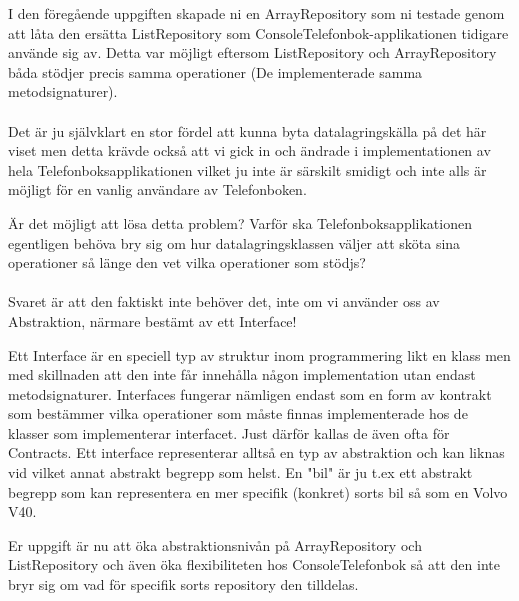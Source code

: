 \documentclass{article}
\begin{document}
I den föregående uppgiften skapade ni en ArrayRepository som ni testade genom att låta den ersätta ListRepository som ConsoleTelefonbok-applikationen tidigare använde sig av. Detta var möjligt eftersom ListRepository och ArrayRepository båda stödjer precis samma operationer (De implementerade samma metodsignaturer).\\ \\
Det är ju självklart en stor fördel att kunna byta datalagringskälla på det här viset men detta krävde också att vi gick in och ändrade i implementationen av hela Telefonboksapplikationen vilket ju inte är särskilt smidigt och inte alls är möjligt för en vanlig användare av Telefonboken.

Är det möjligt att lösa detta problem? Varför ska Telefonboksapplikationen egentligen behöva bry sig om hur datalagringsklassen väljer att sköta sina operationer så länge den vet vilka operationer som stödjs? \\ \\Svaret är att den faktiskt inte behöver det, inte om vi använder oss av Abstraktion, närmare bestämt av ett Interface!

Ett Interface är en speciell typ av struktur inom programmering likt en klass men med skillnaden att den inte får innehålla någon implementation utan endast metodsignaturer. Interfaces fungerar nämligen endast som en form av kontrakt som bestämmer vilka operationer som måste finnas implementerade hos de klasser som implementerar interfacet. Just därför kallas de även ofta för Contracts. Ett interface representerar alltså en typ av abstraktion och kan liknas vid vilket annat abstrakt begrepp som helst. En "bil" är ju t.ex ett abstrakt begrepp som kan representera en mer specifik (konkret) sorts bil  så som en Volvo V40.

Er uppgift är nu att öka abstraktionsnivån på ArrayRepository och ListRepository och även öka flexibiliteten hos ConsoleTelefonbok så att den inte bryr sig om vad för specifik sorts repository den tilldelas.
\end{document}
